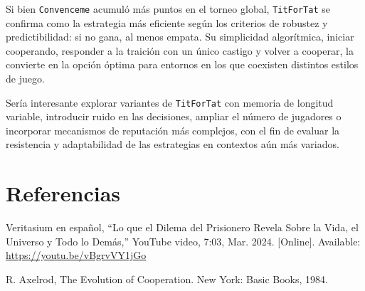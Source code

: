 \documentclass{article}
\begin{document}
Si bien \texttt{Convenceme} acumuló más puntos en el torneo global, 
\texttt{TitForTat} se confirma como la estrategia más eficiente según
 los criterios de robustez y predictibilidad: si no gana, al menos empata. 
 Su simplicidad algorítmica, iniciar cooperando, responder a la traición con un 
 único castigo y volver a cooperar, la convierte en la opción óptima para 
 entornos en los que coexisten distintos estilos de juego.

\medskip

Sería interesante explorar variantes de 
\texttt{TitForTat} con memoria de longitud variable, introducir ruido en las decisiones, 
ampliar el número de jugadores o incorporar mecanismos de reputación más complejos, 
con el fin de evaluar la resistencia y adaptabilidad de las estrategias en contextos 
aún más variados.  


\section{Referencias}
\renewcommand{\refname}{}

\begin{thebibliography}{9}

 \label{ref:vidIntro} Veritasium en español, “Lo que el Dilema del Prisionero Revela 
Sobre la Vida, el Universo y Todo lo Demás,” YouTube video, 7:03, Mar. 2024. [Online]. 
Available: \url{https://youtu.be/vBgrvVY1jGo}

 \label{ref:just} R. Axelrod, The Evolution of Cooperation. New York: 
Basic Books, 1984.

\end{thebibliography}
\end{document}

